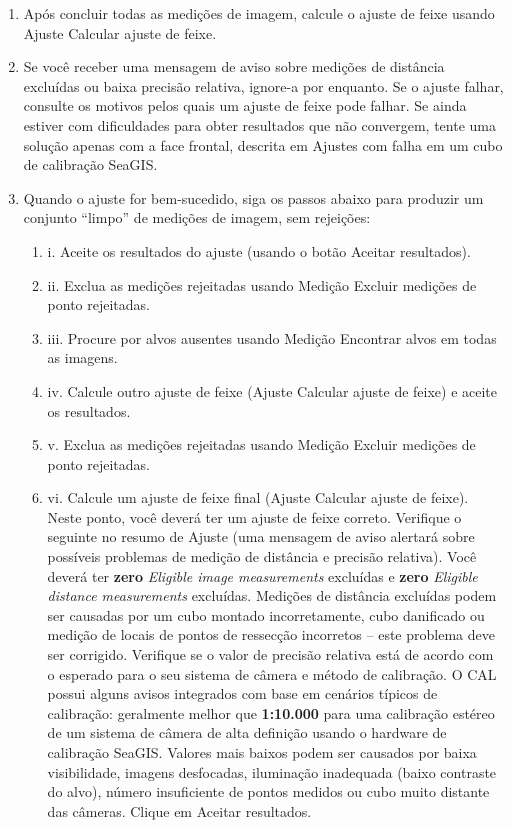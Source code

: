 \documentclass[
  12pt,
  letterpaper,
  DIV=11,
  numbers=noendperiod]{scrreprt}
\begin{document}
\begin{enumerate}
\def\labelenumi{\arabic{enumi}.}
\item
  Após concluir todas as medições de imagem, calcule o ajuste de feixe
  usando Ajuste \textbar{} Calcular ajuste de feixe.
\item
  Se você receber uma mensagem de aviso sobre medições de distância
  excluídas ou baixa precisão relativa, ignore-a por enquanto. Se o
  ajuste falhar, consulte os motivos pelos quais um ajuste de feixe pode
  falhar. Se ainda estiver com dificuldades para obter resultados que
  não convergem, tente uma solução apenas com a face frontal, descrita
  em Ajustes com falha em um cubo de calibração SeaGIS.
\item
  Quando o ajuste for bem-sucedido, siga os passos abaixo para produzir
  um conjunto ``limpo'' de medições de imagem, sem rejeições:

  \begin{enumerate}
  \def\labelenumii{\arabic{enumii}.}
  \item
    i. Aceite os resultados do ajuste (usando o botão Aceitar
    resultados).
  \item
    ii. Exclua as medições rejeitadas usando Medição \textbar{} Excluir
    medições de ponto rejeitadas.
  \item
    iii. Procure por alvos ausentes usando Medição \textbar{} Encontrar
    alvos em todas as imagens.
  \item
    iv. Calcule outro ajuste de feixe (Ajuste \textbar{} Calcular ajuste
    de feixe) e aceite os resultados.
  \item
    v. Exclua as medições rejeitadas usando Medição \textbar{} Excluir
    medições de ponto rejeitadas.
  \item
    vi. Calcule um ajuste de feixe final (Ajuste \textbar{} Calcular
    ajuste de feixe). Neste ponto, você deverá ter um ajuste de feixe
    correto. Verifique o seguinte no resumo de Ajuste (uma mensagem de
    aviso alertará sobre possíveis problemas de medição de distância e
    precisão relativa). Você deverá ter \textbf{zero} \emph{Eligible
    image measurements} excluídas e \textbf{zero} \emph{Eligible
    distance measurements} excluídas. Medições de distância excluídas
    podem ser causadas por um cubo montado incorretamente, cubo
    danificado ou medição de locais de pontos de ressecção incorretos --
    este problema deve ser corrigido. Verifique se o valor de precisão
    relativa está de acordo com o esperado para o seu sistema de câmera
    e método de calibração. O CAL possui alguns avisos integrados com
    base em cenários típicos de calibração: geralmente melhor que
    \textbf{1:10.000} para uma calibração estéreo de um sistema de
    câmera de alta definição usando o hardware de calibração SeaGIS.
    Valores mais baixos podem ser causados \hspace{0pt}\hspace{0pt}por
    baixa visibilidade, imagens desfocadas, iluminação inadequada (baixo
    contraste do alvo), número insuficiente de pontos medidos ou cubo
    muito distante das câmeras. Clique em Aceitar resultados.
  \end{enumerate}
\end{enumerate}
\end{document}
